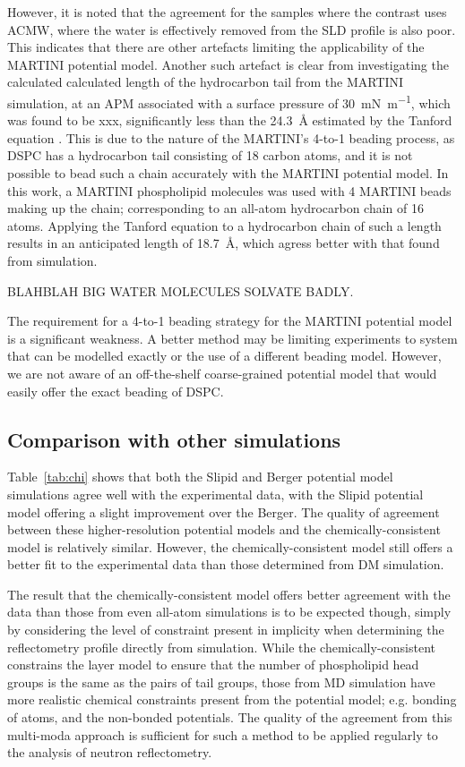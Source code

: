 However, it is noted that the agreement for the samples where the contrast uses ACMW, where the water is effectively removed from the SLD profile is also poor.
This indicates that there are other artefacts limiting the applicability of the MARTINI potential model.
Another such artefact is clear from investigating the calculated calculated length of the hydrocarbon tail from the MARTINI simulation, at an APM associated with a surface pressure of \SI{30}{\milli\newton\per\meter}, which was found to be xxx, significantly less than the \SI{24.3}{\angstrom} estimated by the Tanford equation \cite{tanford_hydrophobic_1980}.
This is due to the nature of the MARTINI's 4-to-1 beading process, as DSPC has a hydrocarbon tail consisting of 18 carbon atoms, and it is not possible to bead such a chain accurately with the MARTINI potential model.
In this work, a MARTINI phospholipid molecules was used with 4 MARTINI beads making up the chain; corresponding to an all-atom hydrocarbon chain of 16 atoms.
Applying the Tanford equation to a hydrocarbon chain of such a length results in an anticipated length of \SI{18.7}{\angstrom}, which agress better with that found from simulation.

BLAHBLAH BIG WATER MOLECULES SOLVATE BADLY.

The requirement for a 4-to-1 beading strategy for the MARTINI potential model is a significant weakness.
A better method may be limiting experiments to system that can be modelled exactly or the use of a different beading model.
However, we are not aware of an off-the-shelf coarse-grained potential model that would easily offer the exact beading of DSPC.

\subsection{Comparison with other simulations}
Table~\ref{tab:chi} shows that both the Slipid and Berger potential model simulations agree well with the experimental data, with the Slipid potential model offering a slight improvement over the Berger.
The quality of agreement between these higher-resolution potential models and the chemically-consistent model is relatively similar.
However, the chemically-consistent model still offers a better fit to the experimental data than those determined from DM simulation.

The result that the chemically-consistent model offers better agreement with the data than those from even all-atom simulations is to be expected though, simply by considering the level of constraint present in implicity when determining the reflectometry profile directly from simulation.
While the chemically-consistent constrains the layer model to ensure that the number of phospholipid head groups is the same as the pairs of tail groups, those from MD simulation have more realistic chemical constraints present from the potential model; e.g. bonding of atoms, and the non-bonded potentials.
The quality of the agreement from this multi-moda approach is sufficient for such a method to be applied regularly to the analysis of neutron reflectometry.

